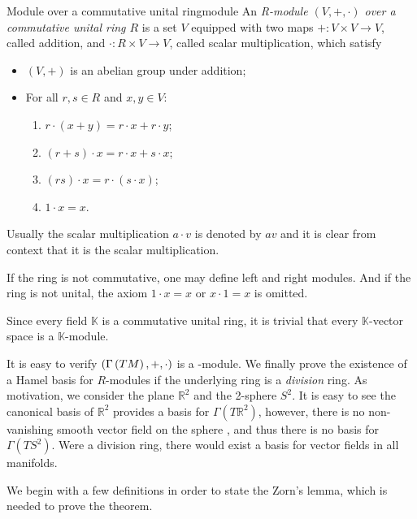 \begin{definition}{Module over a commutative unital ring}{module}
    An \emph{R-module \((V, +, \cdot)\) over a commutative unital ring \(R\)} is a set \(V\) equipped with two maps \(+: V \times V \to V\), called addition, and \(\cdot : R \times V \to V\), called scalar multiplication, which satisfy
    \begin{itemize}
        \item \((V, +)\) is an abelian group under addition;
        \item For all \(r,s \in R\) and \(x, y \in V\):
            \begin{enumerate}[label=(\alph*)]
                \item \(r \cdot (x + y) = r\cdot x + r \cdot y\);
                \item \((r+s) \cdot x  = r\cdot x + s \cdot x\);
                \item \((rs) \cdot x = r\cdot (s \cdot x)\);
                \item \(1 \cdot x = x\).
            \end{enumerate}
    \end{itemize}
    Usually the scalar multiplication \(a \cdot v\) is denoted by \(av\) and it is clear from context that it is the scalar multiplication.
\end{definition}
\begin{remark}
    If the ring is not commutative, one may define left and right modules. And if the ring is not unital, the axiom \(1 \cdot x = x\) or \(x \cdot 1 = x\) is omitted.
\end{remark}
\begin{remark}
    Since every field \(\mathbb{K}\) is a commutative unital ring, it is trivial that every \(\mathbb{K}\)-vector space is a \(\mathbb{K}\)-module.
\end{remark}
It is easy to verify \((\Gamma\left(TM\right), +, \cdot)\) is a -module. We finally prove the existence of a Hamel basis for \(R\)-modules if the underlying ring is a \emph{division} ring. As motivation, we consider the plane \(\mathbb{R}^2\) and the 2-sphere \(S^2\). It is easy to see the canonical basis of \(\mathbb{R}^2\) provides a basis for \(\Gamma(T \mathbb{R}^2)\), however, there is no non-vanishing smooth vector field on the sphere \cite{manfredo_gd}, and thus there is no basis for \(\Gamma(TS^2)\). Were  a division ring, there would exist a basis for vector fields in all manifolds.

We begin with a few definitions \cite{kostrikin_manin} in order to state the Zorn's lemma, which is needed to prove the theorem.

